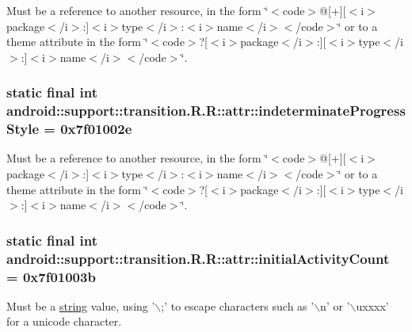 Must be a reference to another resource, in the form \char`\"{}$<$code$>$@\mbox{[}+\mbox{]}\mbox{[}$<$i$>$package$<$/i$>$:\mbox{]}$<$i$>$type$<$/i$>$:$<$i$>$name$<$/i$>$$<$/code$>$\char`\"{} or to a theme attribute in the form \char`\"{}$<$code$>$?\mbox{[}$<$i$>$package$<$/i$>$:\mbox{]}\mbox{[}$<$i$>$type$<$/i$>$:\mbox{]}$<$i$>$name$<$/i$>$$<$/code$>$\char`\"{}. \hypertarget{classandroid_1_1support_1_1transition_1_1_r_1_1attr_ca22f097aebd578da46789b2e5ddb24c}{
\subsubsection[{indeterminateProgressStyle}]{\setlength{\rightskip}{0pt plus 5cm}static final int android::support::transition.R.R::attr::indeterminateProgressStyle = 0x7f01002e}}
\label{classandroid_1_1support_1_1transition_1_1_r_1_1attr_ca22f097aebd578da46789b2e5ddb24c}


Must be a reference to another resource, in the form \char`\"{}$<$code$>$@\mbox{[}+\mbox{]}\mbox{[}$<$i$>$package$<$/i$>$:\mbox{]}$<$i$>$type$<$/i$>$:$<$i$>$name$<$/i$>$$<$/code$>$\char`\"{} or to a theme attribute in the form \char`\"{}$<$code$>$?\mbox{[}$<$i$>$package$<$/i$>$:\mbox{]}\mbox{[}$<$i$>$type$<$/i$>$:\mbox{]}$<$i$>$name$<$/i$>$$<$/code$>$\char`\"{}. \hypertarget{classandroid_1_1support_1_1transition_1_1_r_1_1attr_a990c5e76b04d8d94b586df64902b36a}{
\subsubsection[{initialActivityCount}]{\setlength{\rightskip}{0pt plus 5cm}static final int android::support::transition.R.R::attr::initialActivityCount = 0x7f01003b}}
\label{classandroid_1_1support_1_1transition_1_1_r_1_1attr_a990c5e76b04d8d94b586df64902b36a}


Must be a \hyperlink{classandroid_1_1support_1_1transition_1_1_r_1_1string}{string} value, using '$\backslash$;' to escape characters such as '$\backslash$n' or '$\backslash$uxxxx' for a unicode character. 

